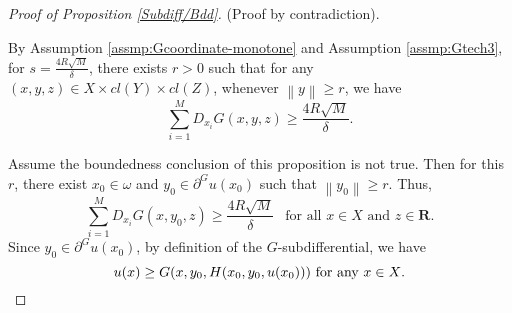 \documentclass[a4paper, 11pt]{amsart}
\numberwithin{equation}{section}
\theoremstyle{plain}
\theoremstyle{definition}
\theoremstyle{remark}
\newcommand{\R}{\mathbf{R}}
\newcommand{\norm}[1]{\left\lVert#1\right\rVert}
\begin{document}
\begin{proof}[Proof of Proposition \ref{Subdiff/Bdd}]
	(Proof by contradiction).\medskip
	
	By Assumption \ref{assmp:Gcoordinate-monotone} and Assumption \ref{assmp:Gtech3}, for $s=\frac{4R\sqrt{M}}{\delta}$, there exists $r>0$ such that for any $(x, y, z)\in X \times  cl(Y) \times cl(Z)$, whenever $\norm{y}\ge r$, we have $$\sum\limits_{i=1}^{M}D_{x_i}G(x,y,z)\ge \frac{4R\sqrt{M}}{\delta}.$$
	
	Assume the boundedness conclusion of this proposition is not true. Then for this $r$, there exist $ x_0 \in \omega$ and  $ y_0\in \partial^G u(x_0)$ such that $\norm{y_0}\ge r$. Thus,
	\begin{equation}\label{eqn_coercivity}
		\sum\limits_{i=1}^{M}D_{x_i}G(x,y_0,z)\ge \frac{4R\sqrt{M}}{\delta} \ \ \text{ for all } x \in X \text{ and } z \in \R.
	\end{equation}
	Since $y_0 \in \partial^G u(x_0)$, by definition of the $G$-subdifferential, we have 
	$$u(x)\ge G(x,y_0,H(x_0,y_0,u(x_0))) \text{ for any $ x \in X$.}$$ 
	

\end{proof}
\end{document}
